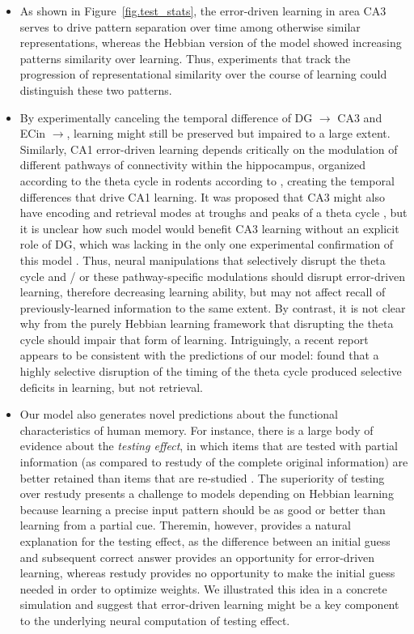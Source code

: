 \documentclass[11pt,twoside]{article}
\newif\myifpdf
\begin{document}
\begin{itemize}
    \item As shown in Figure~\ref{fig.test_stats}, the error-driven learning in area CA3 serves to drive pattern separation over time among otherwise similar representations, whereas the Hebbian version of the model showed increasing patterns similarity over learning.  Thus, experiments that track the progression of representational similarity over the course of learning could distinguish these two patterns.

    \item By experimentally canceling the temporal difference of DG $\rightarrow$ CA3 and ECin $\rightarrow$, learning might still be preserved but impaired to a large extent.  Similarly, CA1 error-driven learning \citep{KetzMorkondaOReilly13} depends critically on the modulation of different pathways of connectivity within the hippocampus, organized according to the theta cycle in rodents according to \citet{HasselmoBodelonWyble02}, creating the temporal differences that drive CA1 learning.  It was proposed that CA3 might also have encoding and retrieval modes at troughs and peaks of a theta cycle \citep{KunecHasselmoKopell05}, but it is unclear how such model would benefit CA3 learning without an explicit role of DG, which was lacking in the only one experimental confirmation of this model \citep{VillarrealGrossDerrick07}.  Thus, neural manipulations that selectively disrupt the theta cycle and / or these pathway-specific modulations should disrupt error-driven learning, therefore decreasing learning ability, but may not affect recall of previously-learned information to the same extent.  By contrast, it is not clear why from the purely Hebbian learning framework that disrupting the theta cycle should impair that form of learning.  Intriguingly, a recent report appears to be consistent with the predictions of our model: \citet{QuirkZutshiSrikanthEtAl21} found that a highly selective disruption of the timing of the theta cycle produced selective deficits in learning, but not retrieval.

    \item Our model also generates novel predictions about the functional characteristics of human memory. For instance, there is a large body of evidence about the \emph{testing effect}, in which items that are tested with partial information (as compared to restudy of the complete original information) are better retained than items that are re-studied  \citep{LiuOReillyRanganath21}.  The superiority of testing over restudy presents a challenge to models depending on Hebbian learning because learning a precise input pattern should be as good or better than learning from a partial cue. Theremin, however, provides a natural explanation for the testing effect, as the difference between an initial guess and subsequent correct answer provides an opportunity for error-driven learning, whereas restudy provides no opportunity to make the initial guess needed in order to optimize weights.  We illustrated this idea in a concrete simulation and suggest that error-driven learning might be a key component to the underlying neural computation of testing effect.
    
\end{itemize}
\end{document}
